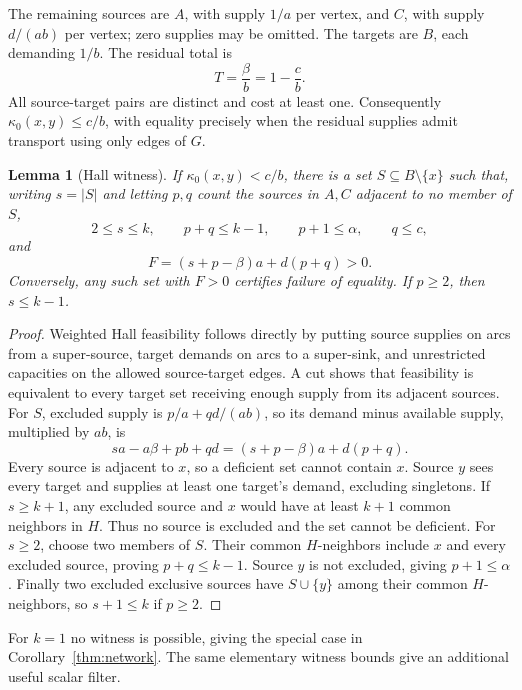 \documentclass[11pt]{article}
\newtheorem{lemma}[theorem]{Lemma}
\theoremstyle{remark}
\begin{document}
The remaining sources are $A$, with supply $1/a$ per vertex, and $C$, with supply $d/(ab)$ per vertex; zero supplies may be omitted. The targets are $B$, each demanding $1/b$. The residual total is
\begin{equation}\label{eq:mass}
 T=\frac{\beta}{b}=1-\frac cb.
\end{equation}
All source-target pairs are distinct and cost at least one. Consequently $\kappa_0(x,y)\le c/b$, with equality precisely when the residual supplies admit transport using only edges of $G$.

\begin{lemma}[Hall witness]\label{lem:hall}
If $\kappa_0(x,y)<c/b$, there is a set $S\subseteq B\setminus\{x\}$ such that, writing $s=|S|$ and letting $p,q$ count the sources in $A,C$ adjacent to no member of $S$,
\begin{equation}\label{eq:hallbounds}
 2\le s\le k,\qquad p+q\le k-1,\qquad
 p+1\le\alpha,\qquad q\le c,
\end{equation}
and
\begin{equation}\label{eq:deficit}
 F=(s+p-\beta)a+d(p+q)>0.
\end{equation}
Conversely, any such set with $F>0$ certifies failure of equality. If $p\ge2$, then $s\le k-1$.
\end{lemma}
\begin{proof}
Weighted Hall feasibility follows directly by putting source supplies on arcs from a super-source, target demands on arcs to a super-sink, and unrestricted capacities on the allowed source-target edges. A cut shows that feasibility is equivalent to every target set receiving enough supply from its adjacent sources. For $S$, excluded supply is $p/a+qd/(ab)$, so its demand minus available supply, multiplied by $ab$, is
\[
 sa-a\beta+pb+qd=(s+p-\beta)a+d(p+q).
\]
Every source is adjacent to $x$, so a deficient set cannot contain $x$. Source $y$ sees every target and supplies at least one target's demand, excluding singletons. If $s\ge k+1$, any excluded source and $x$ would have at least $k+1$ common neighbors in $H$. Thus no source is excluded and the set cannot be deficient. For $s\ge2$, choose two members of $S$. Their common $H$-neighbors include $x$ and every excluded source, proving $p+q\le k-1$. Source $y$ is not excluded, giving $p+1\le\alpha$. Finally two excluded exclusive sources have $S\cup\{y\}$ among their common $H$-neighbors, so $s+1\le k$ if $p\ge2$.
\end{proof}

For $k=1$ no witness is possible, giving the special case in Corollary~\ref{thm:network}. The same elementary witness bounds give an additional useful scalar filter.
\end{document}
